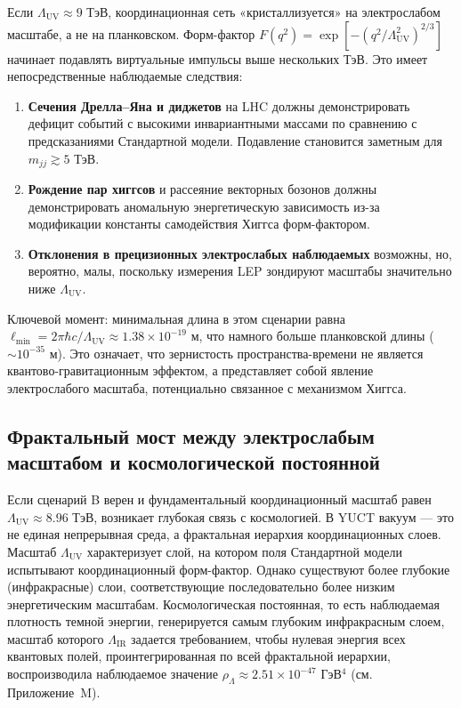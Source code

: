 \documentclass[11pt,a4paper]{article}
\newcommand{\Lmin}{\ell_{\min}}
\newcommand{\LUV}{\Lambda_{\mathrm{UV}}}
\theoremstyle{remark}
\begin{document}
	Если \(\LUV \approx 9\) ТэВ, координационная сеть «кристаллизуется» на электрослабом масштабе, а не на планковском. Форм-фактор \(F(q^2) = \exp[-(q^2/\LUV^2)^{2/3}]\) начинает подавлять виртуальные импульсы выше нескольких ТэВ. Это имеет непосредственные наблюдаемые следствия:
	
	\begin{enumerate}[label=(\arabic*)]
		\item \textbf{Сечения Дрелла–Яна и диджетов} на LHC должны демонстрировать дефицит событий с высокими инвариантными массами по сравнению с предсказаниями Стандартной модели. Подавление становится заметным для \(m_{jj} \gtrsim 5\) ТэВ.
		\item \textbf{Рождение пар хиггсов} и рассеяние векторных бозонов должны демонстрировать аномальную энергетическую зависимость из-за модификации константы самодействия Хиггса форм-фактором.
		\item \textbf{Отклонения в прецизионных электрослабых наблюдаемых} возможны, но, вероятно, малы, поскольку измерения LEP зондируют масштабы значительно ниже \(\LUV\).
	\end{enumerate}
	
	Ключевой момент: минимальная длина в этом сценарии равна \(\Lmin = 2\pi\hbar c/\LUV \approx 1.38\times 10^{-19}\) м, что намного больше планковской длины (\(\sim 10^{-35}\) м). Это означает, что зернистость пространства-времени не является квантово-гравитационным эффектом, а представляет собой явление электрослабого масштаба, потенциально связанное с механизмом Хиггса.
	
	\subsection{Фрактальный мост между электрослабым масштабом и космологической постоянной}
	\label{subsec:bridge}
	
	Если сценарий B верен и фундаментальный координационный масштаб равен \(\LUV \approx 8.96\) ТэВ, возникает глубокая связь с космологией. В YUCT вакуум — это не единая непрерывная среда, а фрактальная иерархия координационных слоев. Масштаб \(\LUV\) характеризует слой, на котором поля Стандартной модели испытывают координационный форм-фактор. Однако существуют более глубокие (инфракрасные) слои, соответствующие последовательно более низким энергетическим масштабам. Космологическая постоянная, то есть наблюдаемая плотность темной энергии, генерируется самым глубоким инфракрасным слоем, масштаб которого \(\Lambda_{\mathrm{IR}}\) задается требованием, чтобы нулевая энергия всех квантовых полей, проинтегрированная по всей фрактальной иерархии, воспроизводила наблюдаемое значение \(\rho_{\Lambda} \approx 2.51 \times 10^{-47}\) ГэВ\(^4\) (см. Приложение~M).
	
\end{document}
